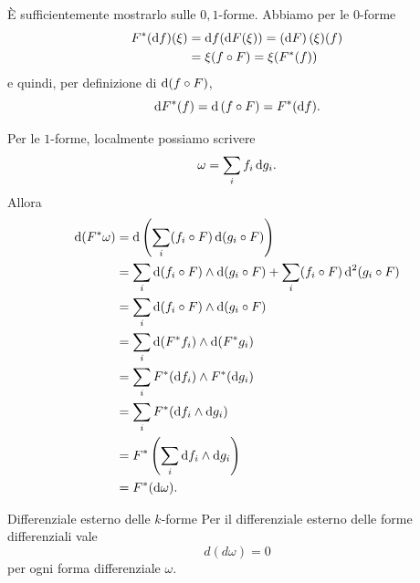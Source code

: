 \documentclass[a4paper]{article}
\begin{document}
\begin{snippetproof}{}
    È sufficientemente mostrarlo sulle \(0,1\)-forme. Abbiamo per le \(0\)-forme
    \begin{align*}
        F^*(\text df)(\xi)
        &= \text df(\text dF(\xi))
        = \left(\text dF\right)(\xi)(f) \\
        &= \xi(f \circ F) = \xi(F^*(f))
    \end{align*}
    e quindi, per definizione di \(\text d(f \circ F)\),
    \[
        \text dF^*(f) = \text d \left(f \circ F\right)
        = F^*(\text df).
    \]

    Per le \(1\)-forme, localmente possiamo scrivere
    \[
        \omega = \sum_i f_i \,\text dg_i .
    \]
    Allora
    \begin{align*}
        \text d(F^*\omega)
        &= \text d\left(\sum_i (f_i \circ F)\,\text d(g_i \circ F)\right) \\
        &= \sum_i \text d(f_i \circ F)\wedge \text d(g_i \circ F)
            + \sum_i (f_i \circ F)\,\text d^2(g_i \circ F) \\
        &= \sum_i \text d(f_i \circ F)\wedge \text d(g_i \circ F) \\
        &= \sum_i \text d(F^*f_i)\wedge \text d(F^*g_i) \\
        &= \sum_i F^*(\text df_i)\wedge F^*(\text dg_i) \\
        &= \sum_i F^*(\text df_i\wedge \text dg_i) \\
        &= F^*\left(\sum_i \text df_i\wedge \text dg_i\right) \\
        &= F^*(\text d\omega).
    \end{align*}
\end{snippetproof}

\pagebreak



\begin{snippetproposition}{Differenziale esterno delle \(k\)-forme}
    Per il differenziale esterno delle forme differenziali vale
    \[
        d(d\omega)=0
    \]
    per ogni forma differenziale \(\omega\).
\end{snippetproposition}
\end{document}
